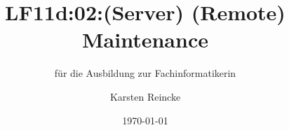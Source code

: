 \documentclass[]{beamer}
\title{LF11d:02:(Server) (Remote) Maintenance}
\subtitle{für die Ausbildung zur Fachinformatikerin}
\institute[GS-LDK]{Gewerbliche Schulen Dillenburg}
\author{Karsten Reincke}
\date{\today}
\def\cfgGl{../../../cfg.gl/}
\begin{document}

\begin{frame}
  \titlepage

  
\end{frame}






\logo{}
\newpage




\end{document}

